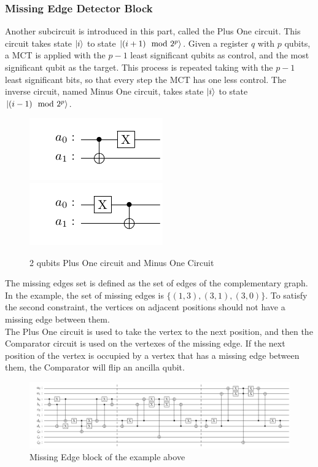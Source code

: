 \documentclass[10pt,a4paper]{article}
\begin{document}
\subsubsection{Missing Edge Detector Block}

Another subcircuit is introduced in this part, called the Plus One circuit. This circuit takes state $\ket{i}$ to state $\ket{(i+1) \mod 2^p}$. Given a register $q$ with $p$ qubits, a MCT is applied with the $p-1$ least significant qubits as control, and the most significant qubit as the target. This process is repeated taking with the $p-1$ least significant bits, so that every step the MCT has one less control. The inverse circuit, named Minus One circuit, takes state $\ket{i}$ to state $\ket{(i-1) \mod 2^p}$.
\begin{figure}[hbtp]
\centering
\includegraphics[scale=1]{figures/plus_one.pdf}
\includegraphics[scale=1]{figures/minus_one.pdf}
\caption{2 qubits Plus One circuit and Minus One Circuit}
\end{figure}

The missing edges set is defined as the set of edges of the complementary graph. In the example, the set of missing edges is $\{(1,3),(3,1),(3,0)\}$. To satisfy the second constraint, the vertices on adjacent positions should not have a missing edge between them.\\
The Plus One circuit is used to take the vertex to the next position, and then the Comparator circuit is used on the vertexes of the missing edge. If the next position of the vertex is occupied by a vertex that has a missing edge between them, the Comparator will flip an ancilla qubit.
\begin{figure}[hbtp]
\centering
\includegraphics[scale=0.5]{figures/missing_edge.pdf}
\caption{Missing Edge block of the example above}
\end{figure}
\end{document}
